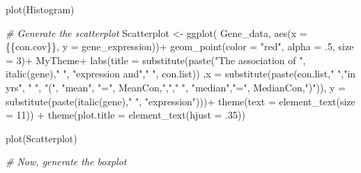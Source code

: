 \documentclass[
]{article}
\newenvironment{Shaded}{\begin{snugshade}}{\end{snugshade}}
\newcommand{\AttributeTok}[1]{\textcolor[rgb]{0.77,0.63,0.00}{#1}}
\newcommand{\CommentTok}[1]{\textcolor[rgb]{0.56,0.35,0.01}{\textit{#1}}}
\newcommand{\DecValTok}[1]{\textcolor[rgb]{0.00,0.00,0.81}{#1}}
\newcommand{\FunctionTok}[1]{\textcolor[rgb]{0.00,0.00,0.00}{#1}}
\newcommand{\NormalTok}[1]{#1}
\newcommand{\OtherTok}[1]{\textcolor[rgb]{0.56,0.35,0.01}{#1}}
\newcommand{\SpecialCharTok}[1]{\textcolor[rgb]{0.00,0.00,0.00}{#1}}
\newcommand{\StringTok}[1]{\textcolor[rgb]{0.31,0.60,0.02}{#1}}
\begin{document}
\begin{Shaded}
\begin{Highlighting}[]
\FunctionTok{plot}\NormalTok{(Histogram)}

\CommentTok{\# Generate the scatterplot}
\NormalTok{Scatterplot }\OtherTok{\textless{}{-}} \FunctionTok{ggplot}\NormalTok{( Gene\_data, }\FunctionTok{aes}\NormalTok{(}\AttributeTok{x =}\NormalTok{ \{\{con.cov\}\}, }\AttributeTok{y =}\NormalTok{ gene\_expression))}\SpecialCharTok{+}
  \FunctionTok{geom\_point}\NormalTok{(}\AttributeTok{color =} \StringTok{"red"}\NormalTok{, }\AttributeTok{alpha =}\NormalTok{ .}\DecValTok{5}\NormalTok{, }\AttributeTok{size =} \DecValTok{3}\NormalTok{)}\SpecialCharTok{+}
\NormalTok{  MyTheme}\SpecialCharTok{+}
  \FunctionTok{labs}\NormalTok{(}\AttributeTok{title =} \FunctionTok{substitute}\NormalTok{(}\FunctionTok{paste}\NormalTok{(}\StringTok{"The association of "}\NormalTok{, }\FunctionTok{italic}\NormalTok{(gene),}\StringTok{" "}\NormalTok{, }\StringTok{"expression and"}\NormalTok{,}\StringTok{" "}\NormalTok{, con.list)) ,}\AttributeTok{x =} \FunctionTok{substitute}\NormalTok{(}\FunctionTok{paste}\NormalTok{(con.list,}\StringTok{" "}\NormalTok{,}\StringTok{"in yrs"}\NormalTok{, }\StringTok{" "}\NormalTok{, }\StringTok{"("}\NormalTok{, }\StringTok{"mean"}\NormalTok{, }\StringTok{"="}\NormalTok{, MeanCon,}\StringTok{","}\NormalTok{,}\StringTok{" "}\NormalTok{, }\StringTok{"median"}\NormalTok{,}\StringTok{"="}\NormalTok{, MedianCon,}\StringTok{")"}\NormalTok{)), }\AttributeTok{y =} \FunctionTok{substitute}\NormalTok{(}\FunctionTok{paste}\NormalTok{(}\FunctionTok{italic}\NormalTok{(gene),}\StringTok{" "}\NormalTok{, }\StringTok{"expression"}\NormalTok{)))}\SpecialCharTok{+}
  \FunctionTok{theme}\NormalTok{(}\AttributeTok{text =} \FunctionTok{element\_text}\NormalTok{(}\AttributeTok{size =} \DecValTok{11}\NormalTok{)) }\SpecialCharTok{+} 
  \FunctionTok{theme}\NormalTok{(}\AttributeTok{plot.title =} \FunctionTok{element\_text}\NormalTok{(}\AttributeTok{hjust =}\NormalTok{ .}\DecValTok{35}\NormalTok{))}

\FunctionTok{plot}\NormalTok{(Scatterplot)}

\CommentTok{\# Now, generate the boxplot}


\end{Highlighting}
\end{Shaded}
\end{document}
